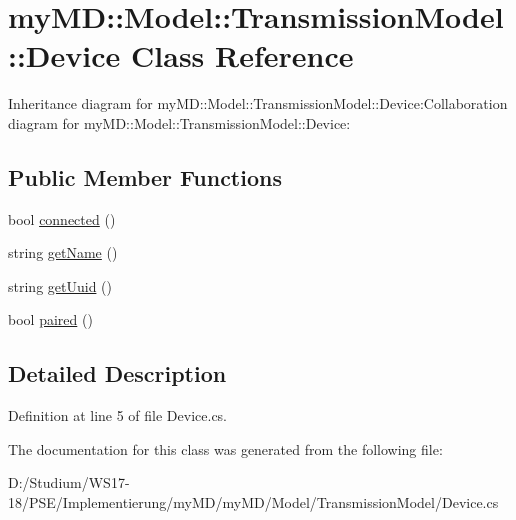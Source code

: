 \hypertarget{classmy_m_d_1_1_model_1_1_transmission_model_1_1_device}{
\section{my\-MD::Model::Transmission\-Model::Device Class Reference}
\label{dc/dcc/classmy_m_d_1_1_model_1_1_transmission_model_1_1_device}
}
Inheritance diagram for my\-MD::Model::Transmission\-Model::Device:Collaboration diagram for my\-MD::Model::Transmission\-Model::Device:\subsection*{Public Member Functions}
\begin{CompactItemize}
\item 
\hypertarget{classmy_m_d_1_1_model_1_1_transmission_model_1_1_device_750c9cacdd3e7317f7d1bfe79913ddc8}{
bool \hyperlink{classmy_m_d_1_1_model_1_1_transmission_model_1_1_device_750c9cacdd3e7317f7d1bfe79913ddc8}{connected} ()}
\label{dc/dcc/classmy_m_d_1_1_model_1_1_transmission_model_1_1_device_750c9cacdd3e7317f7d1bfe79913ddc8}

\item 
\hypertarget{classmy_m_d_1_1_model_1_1_transmission_model_1_1_device_24af3616f1a4bfa79c2550b8ff5b7e83}{
string \hyperlink{classmy_m_d_1_1_model_1_1_transmission_model_1_1_device_24af3616f1a4bfa79c2550b8ff5b7e83}{get\-Name} ()}
\label{dc/dcc/classmy_m_d_1_1_model_1_1_transmission_model_1_1_device_24af3616f1a4bfa79c2550b8ff5b7e83}

\item 
\hypertarget{classmy_m_d_1_1_model_1_1_transmission_model_1_1_device_65f53312f83a6640afd0d7153fa49e8b}{
string \hyperlink{classmy_m_d_1_1_model_1_1_transmission_model_1_1_device_65f53312f83a6640afd0d7153fa49e8b}{get\-Uuid} ()}
\label{dc/dcc/classmy_m_d_1_1_model_1_1_transmission_model_1_1_device_65f53312f83a6640afd0d7153fa49e8b}

\item 
\hypertarget{classmy_m_d_1_1_model_1_1_transmission_model_1_1_device_9e86fc0e4582bfc0357af99eb13e399e}{
bool \hyperlink{classmy_m_d_1_1_model_1_1_transmission_model_1_1_device_9e86fc0e4582bfc0357af99eb13e399e}{paired} ()}
\label{dc/dcc/classmy_m_d_1_1_model_1_1_transmission_model_1_1_device_9e86fc0e4582bfc0357af99eb13e399e}

\end{CompactItemize}


\subsection{Detailed Description}




Definition at line 5 of file Device.cs.

The documentation for this class was generated from the following file:\begin{CompactItemize}
\item 
D:/Studium/WS17-18/PSE/Implementierung/my\-MD/my\-MD/Model/Transmission\-Model/Device.cs\end{CompactItemize}
